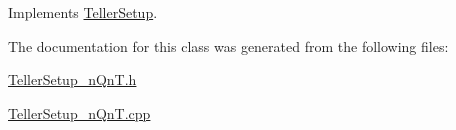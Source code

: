 Implements \hyperlink{class_teller_setup_a2050cd6f277e76cd662b68cf33396034}{Teller\+Setup}.



The documentation for this class was generated from the following files\+:\begin{DoxyCompactItemize}
\item 
\hyperlink{_teller_setup__n_qn_t_8h}{Teller\+Setup\+\_\+n\+Qn\+T.\+h}\item 
\hyperlink{_teller_setup__n_qn_t_8cpp}{Teller\+Setup\+\_\+n\+Qn\+T.\+cpp}\end{DoxyCompactItemize}
